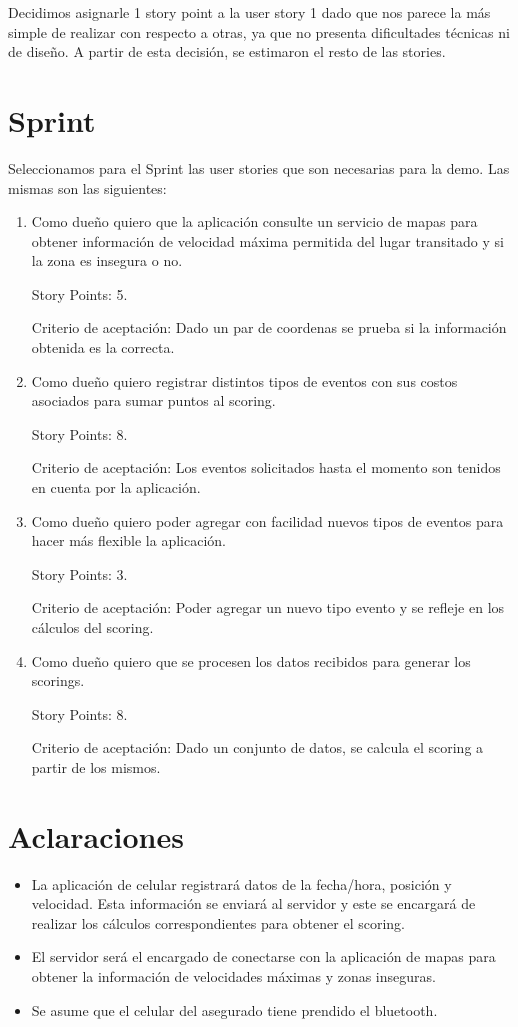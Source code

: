 Decidimos asignarle 1 story point a la user story 1 dado que nos parece la más simple de realizar con respecto a otras, ya que no presenta dificultades técnicas ni de diseño. A partir de esta decisión, se estimaron el resto de las stories.

\newpage

\section{Sprint}

Seleccionamos para el Sprint las user stories que son necesarias para la demo. 
Las mismas son las siguientes:
\begin{enumerate}
\item Como dueño quiero que la aplicación consulte un servicio de mapas para obtener información de velocidad máxima permitida del lugar transitado y si la zona es insegura o no. 

Story Points: 5.

Criterio de aceptación: Dado un par de coordenas se prueba si la información obtenida es la correcta.

\item Como dueño quiero registrar distintos tipos de eventos con sus costos asociados para sumar puntos al scoring. 

Story Points: 8.

Criterio de aceptación: Los eventos solicitados hasta el momento son tenidos en cuenta por la aplicación.

\item Como dueño quiero poder agregar con facilidad nuevos tipos de eventos para hacer más flexible la aplicación. 

Story Points: 3.

Criterio de aceptación: Poder agregar un nuevo tipo evento y se refleje en los cálculos del scoring.

\item Como dueño quiero que se procesen los datos recibidos para generar los scorings.

Story Points: 8.

Criterio de aceptación: Dado un conjunto de datos, se calcula el scoring a partir de los mismos.

\end{enumerate}

\section{Aclaraciones}
\begin{itemize}
\item La aplicación de celular registrará datos de la fecha/hora, posición y velocidad. Esta información se enviará al servidor y este se encargará de realizar los cálculos correspondientes para obtener el scoring.
\item El servidor será el encargado de conectarse con la aplicación de mapas para obtener la información de velocidades máximas y zonas inseguras.
\item Se asume que el celular del asegurado tiene prendido el bluetooth.
\end{itemize}
